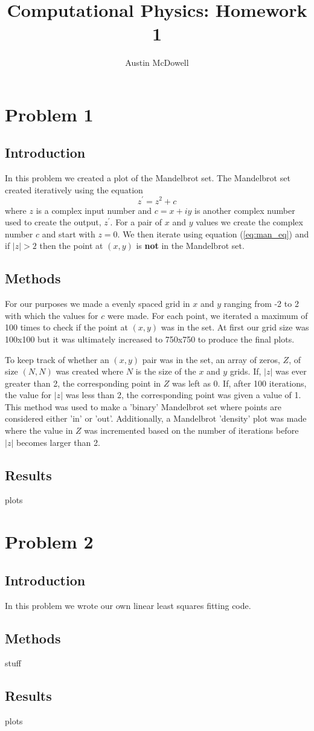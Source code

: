 \documentclass[11pt]{article}
\title{Computational Physics: Homework 1 }
\author{Austin McDowell}
\begin{document}
\maketitle

\section*{Problem 1}
\subsection*{Introduction}
In this problem we created a plot of the Mandelbrot set. The Mandelbrot set created iteratively using the equation
\begin{equation}
\label{eq:man_eq}
z^\prime = z^2 + c
\end{equation}
where $z$ is a complex input number and $c = x + iy$ is another complex number used to create the output, $z^\prime$. For a pair of $x$ and $y$ values we create the complex number $c$ and start with $z=0$. We then iterate using equation (\ref{eq:man_eq}) and if $|z|>2$ then the point at $(x,y)$ is \textbf{not} in the Mandelbrot set. 

\subsection*{Methods}
For our purposes we made a evenly spaced grid in $x$ and $y$ ranging from -2 to 2 with which the values for $c$ were made. For each point, we iterated a maximum of 100 times to check if the point at $(x,y)$ was in the set. At first our grid size was 100x100 but it was ultimately increased to 750x750 to produce the final plots.

To keep track of whether an $(x,y)$ pair was in the set, an array of zeros, $Z$, of size $(N,N)$ was created where $N$ is the size of the $x$ and $y$ grids. If, $|z|$ was ever greater than 2, the corresponding point in $Z$ was left as 0. If, after 100 iterations, the value for $|z|$ was less than 2, the corresponding point was given a value of 1. This method was used to make a 'binary' Mandelbrot set where points are considered either 'in' or 'out'. Additionally, a Mandelbrot 'density' plot was made where the value in $Z$ was incremented based on the number of iterations before $|z|$ becomes larger than 2. 

\subsection*{Results}
plots


\section*{Problem 2}
\subsection*{Introduction}
In this problem we wrote our own linear least squares fitting code. 

\subsection*{Methods}
stuff

\subsection*{Results}
plots
\end{document}
